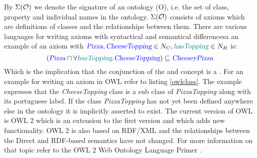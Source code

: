 By $\Sigma({\cal O})$ we denote the signature of an ontology ({\cal O}),
i.e. the set of class, property and individual names in the ontology.
$\Sigma({\cal O})$ consists of axioms which are definitions of classes
and the relationships between them. There are various languages for writing
axioms with syntactical and semantical differencesa an example of an \ALC axiom
with $\DLConVar{Pizza},\DLConVar{CheeseTopping} \in N_C, \DLRolVar{hasTopping} \in N_R$ is:
\begin{equation}
 (\DLConVar{Pizza} \DLand \forall \DLRolVar{hasTopping}.\DLConVar{CheeseTopping}) \sqsubseteq \DLConVar{CheeseyPizza}
\end{equation}
Which is the implication that the conjunction of the 
and  concept is a . For an
example for writing an axiom in OWL refer to listing \ref{owlclass}.
The example expresses that the \emph{CheeseTopping} class is a sub class
of \emph{PizzaTopping} along with its portuguese label.
If the class \emph{PizzaTopping} has not yet been defined anywhere else
in the ontology it is implicitly asserted to exist.
The current version of OWL is OWL 2 which is an extension to the first version
and which adds new functionality.
OWL 2 is also based on RDF/XML and the relationships between the Direct and
RDF-based semantics have not changed.
For more information on that topic refer to the OWL 2 Web Ontology Language Primer \cite{OWL2Primer}.

